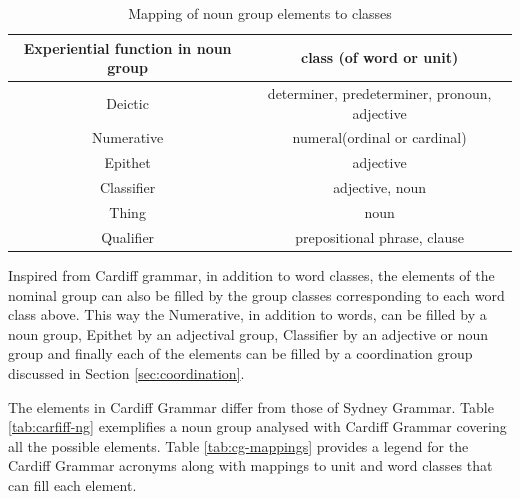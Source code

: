 \begin{table}[h]
        \centering
	\begin{tabulary}{0.9\linewidth}{|C|C|}
		\hline
		\textbf{Experiential function in noun group} & \textbf{class (of word or unit)} \\ \hline
		Deictic                             & determiner, predeterminer, pronoun, adjective \\ \hline
		Numerative                          & numeral(ordinal or cardinal) \\ \hline
		Epithet                             & adjective \\ \hline
		Classifier                          & adjective, noun \\ \hline
		Thing                               & noun                         \\ \hline
		Qualifier                           & prepositional phrase, clause \\ \hline
	\end{tabulary}
	\caption{Mapping of noun group elements to classes \citep[379]{Halliday2013}}
	\label{tab:function-pos-mapping}
\end{table}

Inspired from Cardiff grammar, in addition to word classes, the elements of the nominal group can also be filled by the group classes corresponding to each word class above. This way the Numerative, in addition to words, can be filled by a noun group, Epithet by an adjectival group, Classifier by an adjective or noun group and finally each of the elements can be filled by a coordination group discussed in Section \ref{sec:coordination}.


The elements in Cardiff Grammar differ from those of Sydney Grammar. Table \ref{tab:carfiff-ng} exemplifies a noun group analysed with Cardiff Grammar covering all the possible elements. Table \ref{tab:cg-mappings} provides a legend for the Cardiff Grammar acronyms along with mappings to unit and word classes that can fill each element.

